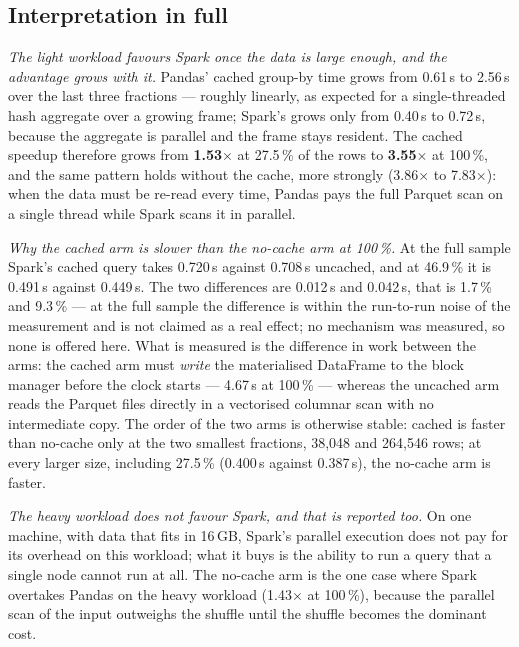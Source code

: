 \documentclass[sigconf,balance=false]{acmart}
\begin{document}
\subsection{Interpretation in full}

\emph{The light workload favours Spark once the data is large enough, and
the advantage grows with it.} Pandas' cached group-by time grows from
0.61\,s to 2.56\,s over the last three fractions --- roughly linearly, as
expected for a single-threaded hash aggregate over a growing frame;
Spark's grows only from 0.40\,s to 0.72\,s, because the aggregate is
parallel and the frame stays resident. The cached speedup therefore grows
from \textbf{1.53$\times$} at 27.5\,\% of the rows to \textbf{3.55$\times$}
at 100\,\%, and the same pattern holds without the cache, more strongly
(3.86$\times$ to 7.83$\times$): when the data must be re-read every time,
Pandas pays the full Parquet scan on a single thread while Spark scans it
in parallel.

\emph{Why the cached arm is slower than the no-cache arm at 100\,\%.} At the
full sample Spark's cached query takes 0.720\,s against 0.708\,s uncached,
and at 46.9\,\% it is 0.491\,s against 0.449\,s. The two differences are
0.012\,s and 0.042\,s, that is 1.7\,\% and 9.3\,\% --- at the full
sample the difference is within the run-to-run noise of the measurement and
is not claimed as a real effect; no mechanism was measured, so none is
offered here. What is measured is the difference in work between the arms:
the cached arm must \emph{write} the materialised DataFrame to the block
manager before the clock starts --- 4.67\,s at 100\,\% --- whereas the
uncached arm reads the Parquet files directly in a vectorised columnar scan
with no intermediate copy. The order of the two arms is otherwise stable:
cached is faster than no-cache only at the two smallest fractions,
38{,}048 and 264{,}546 rows; at every larger size, including 27.5\,\%
(0.400\,s against 0.387\,s), the no-cache arm is faster.

\emph{The heavy workload does not favour Spark, and that is reported too.}
On one machine, with data that fits in 16\,GB, Spark's parallel execution
does not pay for its overhead on this workload; what it buys is the ability
to run a query that a single node cannot run at all. The no-cache arm is
the one case where Spark overtakes Pandas on the heavy workload
(1.43$\times$ at 100\,\%), because the parallel scan of the input
outweighs the shuffle until the shuffle becomes the dominant cost.
\end{document}
